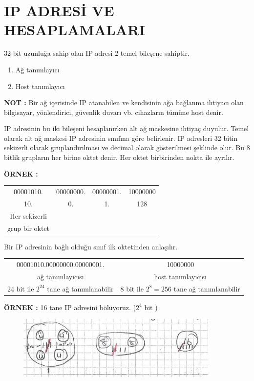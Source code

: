 \section{IP ADRESİ VE HESAPLAMALARI} %

32 bit uzunluğa sahip olan IP adresi 2 temel bileşene sahiptir. 

\begin{enumerate}
\item Ağ tanımlayıcı
\item Host tanımlayıcı
\end{enumerate}

\textbf{NOT : }Bir ağ içerisinde IP atanabilen ve kendisinin ağa bağlanma ihtiyacı olan bilgisayar, yönlendirici, güvenlik duvarı vb. cihazların tümüne host denir. 

IP adresinin bu iki bileşeni hesaplanırken alt ağ maskesine ihtiyaç duyulur. Temel olarak alt ağ maskesi IP adresinin sınıfına göre belirlenir. IP adresleri 32 bitin sekizerli olarak gruplandırılması ve decimal olarak gösterilmesi şeklinde olur. Bu 8 bitlik grupların her birine oktet denir. Her oktet birbirinden nokta ile ayrılır. 

\textbf{ÖRNEK : }
\begin{center}
\begin{tabular}{cccc}
00001010.&00000000.&00000001.&10000000 \\
10.       & 0.      & 1.      & 128      \\
Her sekizerli & & & \\
grup bir oktet & & &
\end{tabular}
\end{center}

Bir IP adresinin bağlı olduğu sınıf ilk oktetinden anlaşılır. 

\begin{center}
\begin{tabular}{cc}
00001010.00000000.00000001.&10000000 \\
ağ tanımlayıcısı           &  host tanımlayıcısı \\ 
24 bit ile $2^{24}$ tane ağ tanımlanabilir & 8 bit ile $2^8=256$ tane ağ tanımlanabilir\\
\end{tabular}
\end{center}

\textbf{ÖRNEK : } 16 tane IP adresini bölüyoruz. (${2^4}$ bit ) 

\begin{figure}[!ht] \centering \includegraphics[width=10cm]{images/gorsel28sayfa} \label{fig:gorsel} \end{figure}

